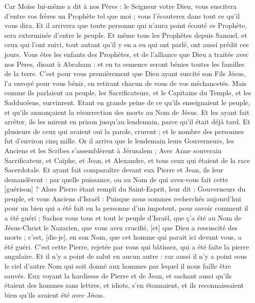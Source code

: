 \begin{multicols}{2}
Car Moïse lui-même a dit à nos Pères : le Seigneur votre Dieu, vous suscitera d'entre vos frères un Prophète tel que moi ; vous l'écouterez dans tout ce qu'il vous dira.
Et il arrivera que toute personne qui n'aura point écouté ce Prophète, sera exterminée d'entre le peuple.
Et même tous les Prophètes depuis Samuel, et ceux qui l'ont suivi, tout autant qu'il y en a eu qui ont parlé, ont aussi prédit ces jours.
Vous êtes les enfants des Prophètes, et de l'alliance que Dieu a traitée avec nos Pères, disant à Abraham : et en ta semence seront bénies toutes les familles de la terre.
C'est pour vous premièrement que Dieu ayant suscité son Fils Jésus, l'a envoyé pour vous bénir, en retirant chacun de vous de vos méchancetés.
\VerseOne{}Mais comme ils parlaient au peuple, les Sacrificateurs, et le Capitaine du Temple, et les Sadducéens, survinrent.
Etant en grande peine de ce qu'ils enseignaient le peuple, et qu'ils annonçaient la résurrection des morts au Nom de Jésus.
Et les ayant fait arrêter, ils les mirent en prison jusqu'au lendemain, parce qu'il était déjà tard.
Et plusieurs de ceux qui avaient ouï la parole, crurent ; et le nombre des personnes fut d'environ cinq mille.
Or il arriva que le lendemain leurs Gouverneurs, les Anciens et les Scribes s'assemblèrent à Jérusalem ;
Avec Anne souverain Sacrificateur, et Caïphe, et Jean, et Alexandre, et tous ceux qui étaient de la race Sacerdotale.
Et ayant fait comparaître devant eux Pierre et Jean, ils leur demandèrent : par quelle puissance, ou au Nom de qui avez-vous fait cette [guérison] ?
Alors Pierre étant rempli du Saint-Esprit, leur dit : Gouverneurs du peuple, et vous Anciens d'Israël :
Puisque nous sommes recherchés aujourd'hui pour un bien qui a été fait en la personne d'un impotent, pour savoir comment il a été guéri ;
Sachez vous tous et tout le peuple d'Israël, que ç'a été au Nom de Jésus-Christ le Nazarien, que vous avez crucifié, [et] que Dieu a ressuscité des morts ; c'est, [dis-je], en son Nom, que cet homme qui parait ici devant vous, a été guéri.
C'est cette Pierre, rejetée par vous qui bâtissez, qui a été faite la pierre angulaire.
Et il n'y a point de salut en aucun autre : car aussi il n'y a point sous le ciel d'autre Nom qui soit donné aux hommes par lequel il nous faille être sauvés.
Eux voyant la hardiesse de Pierre et de Jean, et sachant aussi qu'ils étaient des hommes sans lettres, et idiots, s'en étonnaient, et ils reconnaissaient bien qu'ils avaient été avec Jésus.

\end{multicols}
